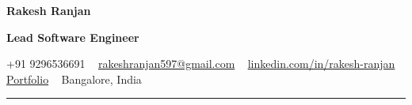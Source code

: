 \documentclass[a4paper,11pt]{article}
\begin{document}
{\color{dark}\Huge\bfseries Rakesh Ranjan}\par
\vspace{0.5pt}
{\color{accent}\normalsize\bfseries Lead Software Engineer}\par
\vspace{1pt}
{\normalsize\sloppy
+91 9296536691 \textbar\ %
\href{mailto:rakeshranjan597@gmail.com}{rakeshranjan597@gmail.com} \textbar\ %
\href{https://www.linkedin.com/in/rakesh-ranjan-00035315b/}{linkedin.com/in/rakesh-ranjan} \textbar\ %
\href{https://rakeshranjan597.github.io/portfolio/}{Portfolio} \textbar\ %
Bangalore, India
\par}
\vspace{2pt}
{\color{accent}\rule{\linewidth}{1.5pt}}\par
\vspace{2pt}
\end{document}
